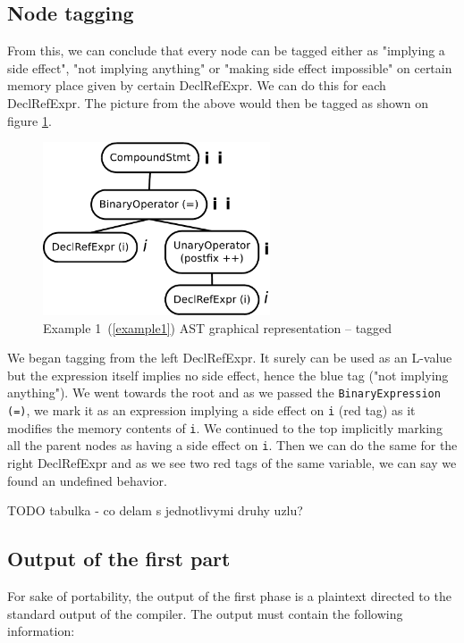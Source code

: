 \subsection{Node tagging}
From this, we can conclude that every node can be tagged either as "implying a side effect", "not implying anything" or "making side effect impossible" on certain memory place given by certain DeclRefExpr. We can do this for each DeclRefExpr. The picture from the above would then be tagged as shown on figure \ref{ASTtagged}.
\begin{figure}
    \caption{Example 1~(\ref{example1}) AST graphical representation -- tagged}
    \label{ASTtagged}
    \centering
        \includegraphics[width=0.6\textwidth]{fig/example1G-tagged.pdf}
\end{figure}

We began tagging from the left DeclRefExpr. It surely can be used as an L-value but the expression itself implies no side effect, hence the blue tag ("not implying anything"). We went towards the root and as we passed the \verb|BinaryExpression (=)|, we mark it as an expression implying a side effect on \verb|i| (red tag) as it modifies the memory contents of \verb|i|. We continued to the top implicitly marking all the parent nodes as having a side effect on \verb|i|. Then we can do the same for the right DeclRefExpr and as we see two red tags of the same variable, we can say we found an undefined behavior.

TODO tabulka - co delam s jednotlivymi druhy uzlu?

\subsection{Output of the first part}
For sake of portability, the output of the first phase is a plaintext directed to the standard output of the compiler. The output must contain the following information:


